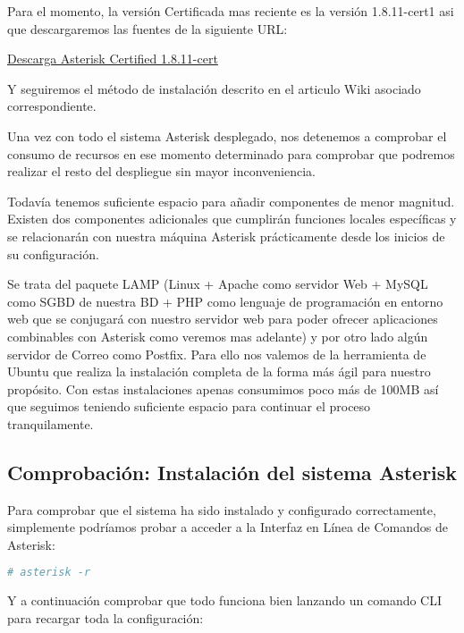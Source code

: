 Para el momento, la versión Certificada mas reciente es la versión 1.8.11-cert1 asi que descargaremos las fuentes de la siguiente URL:

\href{http://downloads.asterisk.org/pub/telephony/certified-asterisk/releases/certified-asterisk-1.8.11-cert1.tar.gz}{Descarga Asterisk Certified 1.8.11-cert}

Y seguiremos el método de instalación descrito en el articulo Wiki asociado correspondiente.

Una vez con todo el sistema Asterisk desplegado, nos detenemos a comprobar el consumo de recursos en ese momento determinado para comprobar que podremos realizar el resto del despliegue sin mayor inconveniencia.


Todavía tenemos suficiente espacio para añadir componentes de menor magnitud. Existen dos componentes adicionales que cumplirán funciones locales específicas y se relacionarán con nuestra máquina Asterisk prácticamente desde los inicios de su configuración. 

Se trata del paquete LAMP (Linux + Apache como servidor Web + MySQL como SGBD de nuestra BD + PHP como lenguaje de programación en entorno web que se conjugará con nuestro servidor web para poder ofrecer aplicaciones combinables con Asterisk como veremos mas adelante) y por otro lado algún servidor de Correo como Postfix. Para ello nos valemos de la herramienta  de Ubuntu que realiza la instalación completa de la forma más ágil para nuestro propósito. Con estas instalaciones apenas consumimos poco más de 100MB así que seguimos teniendo suficiente espacio para continuar el proceso tranquilamente.

\subsection{Comprobación: Instalación del sistema Asterisk}

Para comprobar que el sistema ha sido instalado y configurado correctamente, simplemente podríamos probar a acceder a la Interfaz en Línea de Comandos de Asterisk:

\begin{lstlisting}[language=sh]
# asterisk -r
\end{lstlisting}

Y a continuación comprobar que todo funciona bien lanzando un comando CLI para recargar toda la configuración:

